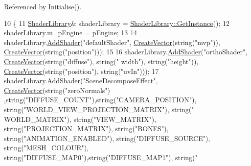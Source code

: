 Referenced by Initialise().


\begin{DoxyCode}
10 \{
11     \hyperlink{struct_shader_library}{ShaderLibrary}& shaderLibrary = \hyperlink{class_singleton_a74f32751d99bf3cc95fe17aba11f4b07}{ShaderLibrary::GetInstance}();
12   shaderLibrary.\hyperlink{struct_shader_library_a55b6f40cf696b902d6826ed4d3acae76}{m\_pEngine} = pEngine;
13 
14     shaderLibrary.\hyperlink{struct_shader_library_a5fac5a46dda49ceb6d1d361fd68b62a2}{AddShader}(\textcolor{stringliteral}{"defaultShader"}, \hyperlink{_utility_8h_a436e7214fa09365bcae7bc4386dab85b}{CreateVector}(\textcolor{keywordtype}{string}(\textcolor{stringliteral}{"mvp"})), 
      \hyperlink{_utility_8h_a436e7214fa09365bcae7bc4386dab85b}{CreateVector}(\textcolor{keywordtype}{string}(\textcolor{stringliteral}{"position"})));
15 
16     shaderLibrary.\hyperlink{struct_shader_library_a5fac5a46dda49ceb6d1d361fd68b62a2}{AddShader}(\textcolor{stringliteral}{"orthoShader"}, \hyperlink{_utility_8h_a436e7214fa09365bcae7bc4386dab85b}{CreateVector}(\textcolor{keywordtype}{string}(\textcolor{stringliteral}{"diffuse"}), \textcolor{keywordtype}{string}(\textcolor{stringliteral}{"
      width"}), \textcolor{keywordtype}{string}(\textcolor{stringliteral}{"height"})), \hyperlink{_utility_8h_a436e7214fa09365bcae7bc4386dab85b}{CreateVector}(\textcolor{keywordtype}{string}(\textcolor{stringliteral}{"position"}), \textcolor{keywordtype}{string}(\textcolor{stringliteral}{"uvIn"})));
17     shaderLibrary.\hyperlink{struct_shader_library_a5fac5a46dda49ceb6d1d361fd68b62a2}{AddShader}(\textcolor{stringliteral}{"SceneDecomposeEffect"}, \hyperlink{_utility_8h_a436e7214fa09365bcae7bc4386dab85b}{CreateVector}(\textcolor{keywordtype}{string}(\textcolor{stringliteral}{"zeroNormals"})
      ,\textcolor{keywordtype}{string}(\textcolor{stringliteral}{"DIFFUSE\_COUNT"}),\textcolor{keywordtype}{string}(\textcolor{stringliteral}{"CAMERA\_POSITION"}), \textcolor{keywordtype}{string}(\textcolor{stringliteral}{"WORLD\_VIEW\_PROJECTION\_MATRIX"}), \textcolor{keywordtype}{string}(\textcolor{stringliteral}{"
      WORLD\_MATRIX"}), \textcolor{keywordtype}{string}(\textcolor{stringliteral}{"VIEW\_MATRIX"}), \textcolor{keywordtype}{string}(\textcolor{stringliteral}{"PROJECTION\_MATRIX"}), \textcolor{keywordtype}{string}(\textcolor{stringliteral}{"BONES"}), \textcolor{keywordtype}{string}(\textcolor{stringliteral}{"ANIMATION\_ENABLED"}), \textcolor{keywordtype}{
      string}(\textcolor{stringliteral}{"DIFFUSE\_SOURCE"}), \textcolor{keywordtype}{string}(\textcolor{stringliteral}{"MESH\_COLOUR"}), \textcolor{keywordtype}{string}(\textcolor{stringliteral}{"DIFFUSE\_MAP0"}),\textcolor{keywordtype}{string}(\textcolor{stringliteral}{"DIFFUSE\_MAP1"}), \textcolor{keywordtype}{string}(\textcolor{stringliteral}{"
}
\end{DoxyCode}
